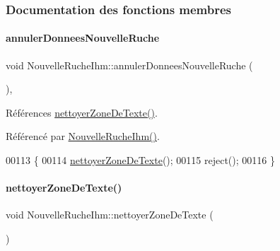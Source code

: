 \subsubsection{Documentation des fonctions membres}
\mbox{\label{class_nouvelle_ruche_ihm_a8967974b5606b7096960f3b607b5b58a}} 
\paragraph{\texorpdfstring{annuler\+Donnees\+Nouvelle\+Ruche}{annulerDonneesNouvelleRuche}}
{\footnotesize\ttfamily void Nouvelle\+Ruche\+Ihm\+::annuler\+Donnees\+Nouvelle\+Ruche (\begin{DoxyParamCaption}{ }\end{DoxyParamCaption})\hspace{0.3cm}{\ttfamily [private]}, {\ttfamily [slot]}}



Références \hyperlink{class_nouvelle_ruche_ihm_a09ddd61a2bd2b6779865e7d3b93ec2eb}{nettoyer\+Zone\+De\+Texte()}.



Référencé par \hyperlink{class_nouvelle_ruche_ihm_a338b9af0b96ed0839a8d5008c8c89cc4}{Nouvelle\+Ruche\+Ihm()}.


\begin{DoxyCode}
00113 \{
00114     \hyperlink{class_nouvelle_ruche_ihm_a09ddd61a2bd2b6779865e7d3b93ec2eb}{nettoyerZoneDeTexte}();
00115     reject();
00116 \}
\end{DoxyCode}
\mbox{\label{class_nouvelle_ruche_ihm_a09ddd61a2bd2b6779865e7d3b93ec2eb}} 
\paragraph{\texorpdfstring{nettoyer\+Zone\+De\+Texte()}{nettoyerZoneDeTexte()}}
{\footnotesize\ttfamily void Nouvelle\+Ruche\+Ihm\+::nettoyer\+Zone\+De\+Texte (\begin{DoxyParamCaption}{ }\end{DoxyParamCaption})\hspace{0.3cm}{\ttfamily [private]}}



